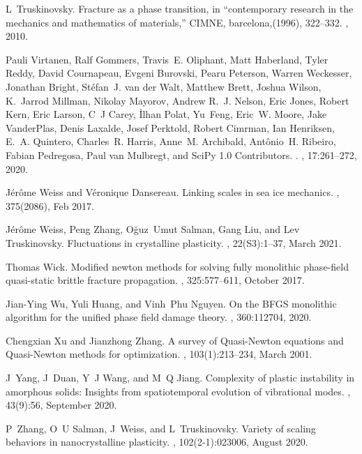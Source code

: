 \documentclass[10pt]{article}
\begin{document}
\begin{thebibliography}{10}
L~Truskinovsky.
\newblock Fracture as a phase transition, in ``contemporary research in the mechanics and mathematics of materials,'' {CIMNE}, barcelona,(1996), 322--332.
, 2010.

Pauli Virtanen, Ralf Gommers, Travis~E. Oliphant, Matt Haberland, Tyler Reddy, David Cournapeau, Evgeni Burovski, Pearu Peterson, Warren Weckesser, Jonathan Bright, St{\'e}fan~J. {van der Walt}, Matthew Brett, Joshua Wilson, K.~Jarrod Millman, Nikolay Mayorov, Andrew R.~J. Nelson, Eric Jones, Robert Kern, Eric Larson, C~J Carey, {\.I}lhan Polat, Yu~Feng, Eric~W. Moore, Jake {VanderPlas}, Denis Laxalde, Josef Perktold, Robert Cimrman, Ian Henriksen, E.~A. Quintero, Charles~R. Harris, Anne~M. Archibald, Ant{\^o}nio~H. Ribeiro, Fabian Pedregosa, Paul {van Mulbregt}, and {SciPy 1.0 Contributors}.
.
, 17:261--272, 2020.

J{\'e}r{\^o}me Weiss and V{\'e}ronique Dansereau.
\newblock Linking scales in sea ice mechanics.
, 375(2086), Feb 2017.

J{\'e}r{\^o}me Weiss, Peng Zhang, O{\u g}uz~Umut Salman, Gang Liu, and Lev Truskinovsky.
\newblock Fluctuations in crystalline plasticity.
, 22(S3):1--37, March 2021.

Thomas Wick.
\newblock Modified newton methods for solving fully monolithic phase-field quasi-static brittle fracture propagation.
, 325:577--611, October 2017.

Jian-Ying Wu, Yuli Huang, and Vinh~Phu Nguyen.
\newblock On the {BFGS} monolithic algorithm for the unified phase field damage theory.
, 360:112704, 2020.

Chengxian Xu and Jianzhong Zhang.
\newblock A survey of {Quasi-Newton} equations and {Quasi-Newton} methods for optimization.
, 103(1):213--234, March 2001.

J~Yang, J~Duan, Y~J Wang, and M~Q Jiang.
\newblock Complexity of plastic instability in amorphous solids: Insights from spatiotemporal evolution of vibrational modes.
, 43(9):56, September 2020.

P~Zhang, O~U Salman, J~Weiss, and L~Truskinovsky.
\newblock Variety of scaling behaviors in nanocrystalline plasticity.
, 102(2-1):023006, August 2020.

\end{thebibliography}
\end{document}
